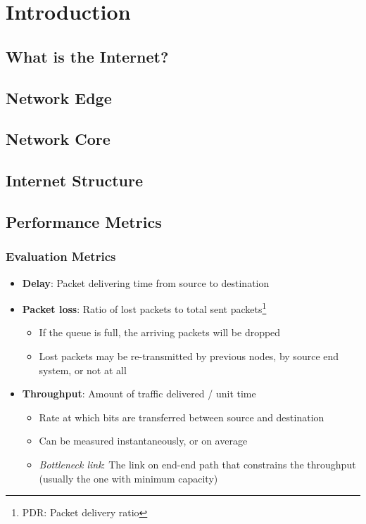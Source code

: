 \section{Introduction}
\subsection{What is the Internet?}

\subsection{Network Edge}

\subsection{Network Core}

\subsection{Internet Structure}

\subsection{Performance Metrics}
\subsubsection{Evaluation Metrics}
\begin{itemize}
	\item \textbf{Delay}: Packet delivering time from source to destination
	\item \textbf{Packet loss}: Ratio of lost packets to total sent packets\footnote{PDR: Packet delivery ratio}
	\begin{itemize}
		\item If the queue is full, the arriving packets will be dropped
		\item Lost packets may be re-transmitted by previous nodes, by source end system, or not at all
	\end{itemize}
	\item \textbf{Throughput}: Amount of traffic delivered / unit time
	\begin{itemize}
		\item Rate at which bits are transferred between source and destination
		\item Can be measured instantaneously, or on average
		\item \textit{Bottleneck link}: The link on end-end path that constrains the throughput (usually the one with minimum capacity)
	\end{itemize}
\end{itemize}

